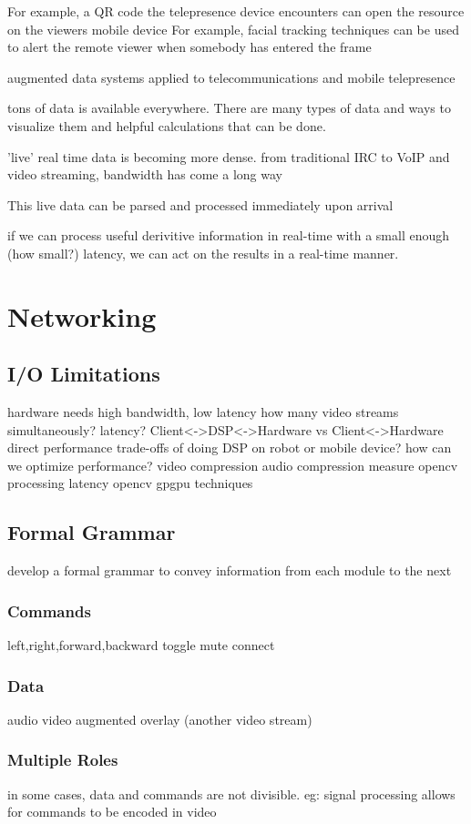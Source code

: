 \documentclass[final,a4paper,12pt]{report}
\begin{document}
For example, a QR code the telepresence device encounters can open the resource on the viewers mobile device
For example, facial tracking techniques can be used to alert the remote viewer when somebody has entered the frame

augmented data systems applied to telecommunications and mobile telepresence

tons of data is available everywhere. There are many types of data and ways to visualize them and helpful calculations that can be done.

'live' real time data is becoming more dense. from traditional IRC to VoIP and video streaming, bandwidth has come a long way

This live data can be parsed and processed immediately upon arrival

if we can process useful derivitive information in real-time with a small enough (how small?) latency, we can act on the results in a real-time manner.

\section{Networking}
	\subsection{I/O Limitations}
		hardware needs high bandwidth, low latency
		how many video streams simultaneously?
		latency? Client\textless -\textgreater DSP\textless -\textgreater Hardware vs Client\textless -\textgreater Hardware direct
		performance trade-offs of doing DSP on robot or mobile device?
		how can we optimize performance?
			video compression
			audio compression
			measure opencv processing latency
			opencv gpgpu techniques
	\subsection{Formal Grammar}
		develop a formal grammar to convey information from each module to the next
		\subsubsection{Commands}
			left,right,forward,backward
			toggle mute
			connect
		\subsubsection{Data}
			audio
			video
			augmented overlay (another video stream)
		\subsubsection{Multiple Roles}
			in some cases, data and commands are not divisible. eg: signal processing allows for commands to be encoded in video
\end{document}
